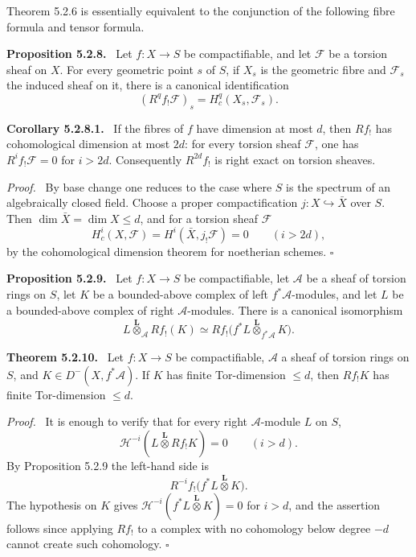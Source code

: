 \documentclass[12pt]{article}
\newcommand{\Aa}{\mathcal A}
\newcommand{\Ff}{\mathcal F}
\newcommand{\Hh}{\mathcal H}
\newcommand{\otimesL}{\mathbin{\overset{\mathbf L}{\otimes}}}
\newcommand{\qedtext}{\hfill\(\square\)}
\newenvironment{statement}[1]{\par\medskip\noindent\textbf{#1.}\ }{\par\medskip}
\newenvironment{prooftext}[1][Proof]{\par\noindent\emph{#1.}\ }{\par\medskip}
\begin{document}
Theorem 5.2.6 is essentially equivalent to the conjunction of the following fibre formula and tensor formula.

\begin{statement}{Proposition 5.2.8}
Let \(f:X\to S\) be compactifiable, and let \(\Ff\) be a torsion sheaf on \(X\). For every geometric point \(s\) of \(S\), if \(X_s\) is the geometric fibre and \(\Ff_s\) the induced sheaf on it, there is a canonical identification
\[
(R^qf_!\Ff)_s=H^q_c(X_s,\Ff_s).
\]
\end{statement}

\begin{statement}{Corollary 5.2.8.1}
If the fibres of \(f\) have dimension at most \(d\), then \(Rf_!\) has cohomological dimension at most \(2d\): for every torsion sheaf \(\Ff\), one has \(R^if_!\Ff=0\) for \(i>2d\). Consequently \(R^{2d}f_!\) is right exact on torsion sheaves.
\end{statement}

\begin{prooftext}
By base change one reduces to the case where \(S\) is the spectrum of an algebraically closed field. Choose a proper compactification \(j:X\hookrightarrow \bar X\) over \(S\). Then \(\dim\bar X=\dim X\le d\), and for a torsion sheaf \(\Ff\)
\[
H^i_c(X,\Ff)=H^i(\bar X,j_!\Ff)=0\qquad (i>2d),
\]
by the cohomological dimension theorem for noetherian schemes. \qedtext
\end{prooftext}

\begin{statement}{Proposition 5.2.9}
Let \(f:X\to S\) be compactifiable, let \(\Aa\) be a sheaf of torsion rings on \(S\), let \(K\) be a bounded-above complex of left \(f^*\Aa\)-modules, and let \(L\) be a bounded-above complex of right \(\Aa\)-modules. There is a canonical isomorphism
\[
L\otimesL_{\Aa} Rf_!(K)
\simeq
Rf_!\bigl(f^*L\otimesL_{f^*\Aa}K\bigr).
\]
\end{statement}

\begin{statement}{Theorem 5.2.10}
Let \(f:X\to S\) be compactifiable, \(\Aa\) a sheaf of torsion rings on \(S\), and \(K\in D^-(X,f^*\Aa)\). If \(K\) has finite Tor-dimension \(\le d\), then \(Rf_!K\) has finite Tor-dimension \(\le d\).
\end{statement}

\begin{prooftext}
It is enough to verify that for every right \(\Aa\)-module \(L\) on \(S\),
\[
\Hh^{-i}(L\otimesL Rf_!K)=0\qquad (i>d).
\]
By Proposition 5.2.9 the left-hand side is
\[
R^{-i}f_!\bigl(f^*L\otimesL K\bigr).
\]
The hypothesis on \(K\) gives \(\Hh^{-i}(f^*L\otimesL K)=0\) for \(i>d\), and the assertion follows since applying \(Rf_!\) to a complex with no cohomology below degree \(-d\) cannot create such cohomology. \qedtext
\end{prooftext}
\end{document}
